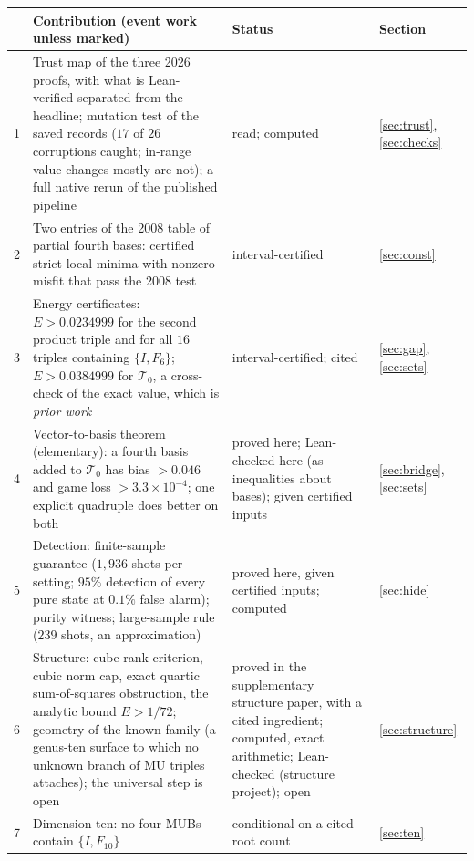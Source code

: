 \documentclass[11pt]{article}
\newcommand{\Tz}{\mathcal{T}_0}          %
\newcommand{\E}{E}                       %
\theoremstyle{definition}
\theoremstyle{remark}
\begin{document}
\begin{center}
\small
\begin{tabular}{@{}p{}p{}p{}p{}@{}}
\toprule
 & Contribution (event work unless marked) & Status & Section\\
\midrule
1 & Trust map of the three 2026 proofs, with what is Lean-verified separated from the headline; mutation test of
    the saved records ($17$ of $26$ corruptions caught; in-range value changes mostly are not); a full native rerun of the published pipeline & read; computed &
    \ref{sec:trust}, \ref{sec:checks}\\
2 & Two entries of the 2008 table of partial fourth bases: certified strict local minima with nonzero misfit that
    pass the 2008 test & interval-certified & \ref{sec:const}\\
3 & Energy certificates: $\E>0.0234999$ for the second product triple and for all $16$ triples containing
    $\{I,F_6\}$; $\E>0.0384999$ for $\Tz$, a cross-check of the exact value, which is \emph{prior work}
    \cite{Erlwein} & interval-certified; cited & \ref{sec:gap}, \ref{sec:sets}\\
4 & Vector-to-basis theorem (elementary): a fourth basis added to $\Tz$ has bias $>0.046$ and game loss
    $>3.3\times10^{-4}$; one explicit quadruple does better on both & proved here; Lean-checked here (as
    inequalities about bases); given certified inputs &
    \ref{sec:bridge}, \ref{sec:sets}\\
5 & Detection: finite-sample guarantee ($1{,}936$ shots per setting; $95\%$ detection of every pure state at
    $0.1\%$ false alarm); purity witness; large-sample rule ($239$ shots, an approximation) & proved here, given
    certified inputs; computed & \ref{sec:hide}\\
\midrule
6 & Structure: cube-rank criterion, cubic norm cap, exact quartic sum-of-squares obstruction, the
    analytic bound $\E>1/72$; geometry of the known family (a genus-ten surface to which no unknown branch of MU
    triples attaches); the universal step is open & proved in the supplementary structure paper, with a cited
    ingredient; computed, exact arithmetic; Lean-checked (structure project); open & \ref{sec:structure}\\
7 & Dimension ten: no four MUBs contain $\{I,F_{10}\}$ & conditional on a cited root count & \ref{sec:ten}\\
\bottomrule
\end{tabular}
\end{center}
\end{document}

